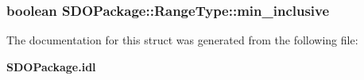 \subsubsection[{min\_\-inclusive}]{\setlength{\rightskip}{0pt plus 5cm}boolean {\bf SDOPackage::RangeType::min\_\-inclusive}}\label{structSDOPackage_1_1RangeType_a59bf920ae92bdce181dfa296a03a72c7}


The documentation for this struct was generated from the following file:\begin{DoxyCompactItemize}
\item 
{\bf SDOPackage.idl}\end{DoxyCompactItemize}
